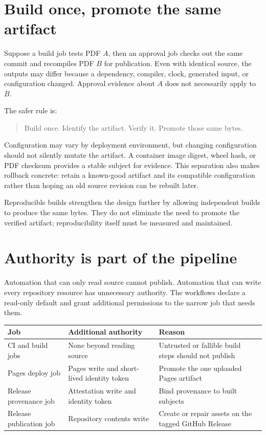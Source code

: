\section{Build once, promote the same artifact}

Suppose a build job tests PDF $A$, then an approval job checks out the same
commit and recompiles PDF $B$ for publication. Even with identical source, the
outputs may differ because a dependency, compiler, clock, generated input, or
configuration changed. Approval evidence about $A$ does not necessarily apply
to $B$.

The safer rule is:

\begin{quote}
Build once. Identify the artifact. Verify it. Promote those same bytes.
\end{quote}

Configuration may vary by deployment environment, but changing configuration
should not silently mutate the artifact. A container image digest, wheel hash,
or PDF checksum provides a stable subject for evidence. This separation also
makes rollback concrete: retain a known-good artifact and its compatible
configuration rather than hoping an old source revision can be rebuilt later.

Reproducible builds strengthen the design further by allowing independent
builds to produce the same bytes. They do not eliminate the need to promote the
verified artifact; reproducibility itself must be measured and maintained.

\section{Authority is part of the pipeline}

Automation that can only read source cannot publish. Automation that can write
every repository resource has unnecessary authority. The workflows declare a
read-only default and grant additional permissions to the narrow job that needs
them.

\begin{longtable}{@{}
  >{\raggedright\arraybackslash}p{}
  >{\raggedright\arraybackslash}p{}
  >{\raggedright\arraybackslash}p{}@{}}
\toprule
\textbf{Job} & \textbf{Additional authority} & \textbf{Reason} \\
\midrule
\endhead
CI and build jobs & None beyond reading source & Untrusted or fallible build
steps should not publish \\
Pages deploy job & Pages write and short-lived identity token & Promote the one
uploaded Pages artifact \\
Release provenance job & Attestation write and identity token & Bind provenance
to built subjects \\
Release publication job & Repository contents write & Create or repair assets
on the tagged GitHub Release \\
\bottomrule
\end{longtable}

